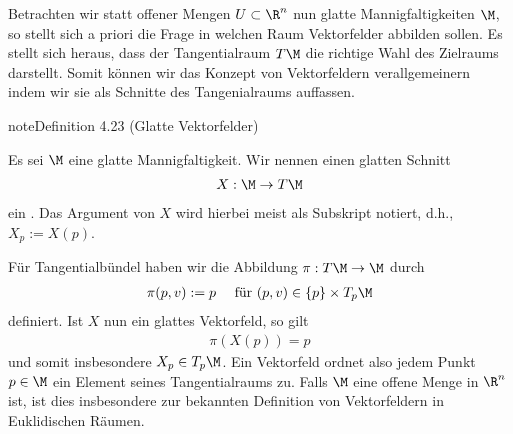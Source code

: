 \documentclass[letterpaper,10pt,english]{jupyterBook}
\begin{document}
\sphinxAtStartPar
Betrachten wir statt offener Mengen \(U\subset\R^n\) nun glatte Mannigfaltigkeiten \(\M\), so stellt sich a priori die Frage in welchen Raum Vektorfelder abbilden sollen.
Es stellt sich heraus, dass der Tangentialraum \(T\M\) die richtige Wahl des Zielraums darstellt.
Somit können wir das Konzept von Vektorfeldern verallgemeinern indem wir sie als Schnitte des Tangenialraums auffassen.
\label{manifolds/tangential:definition-30}
\begin{sphinxadmonition}{note}{Definition 4.23 (Glatte Vektorfelder)}



\sphinxAtStartPar
Es sei \(\M\) eine glatte Mannigfaltigkeit.
Wir nennen einen glatten Schnitt
\begin{equation*}
\begin{split}X:\M\to T\M\end{split}
\end{equation*}
\sphinxAtStartPar
ein .
Das Argument von \(X\) wird hierbei meist als Subskript notiert, d.h., \(X_p := X(p)\).
\end{sphinxadmonition}

\sphinxAtStartPar
Für Tangentialbündel haben wir die Abbildung \(\pi:T\M\to\M\) durch
\begin{equation*}
\begin{split}\pi(p,v):= p\quad\text{ für } (p,v)\in\{p\}\times T_p\M\end{split}
\end{equation*}
\sphinxAtStartPar
definiert.
Ist \(X\) nun ein glattes Vektorfeld, so gilt
\begin{equation*}
\begin{split}\pi(X(p)) = p\end{split}
\end{equation*}
\sphinxAtStartPar
und somit insbesondere \(X_p\in T_p\M\).
Ein Vektorfeld ordnet also jedem Punkt \(p\in\M\) ein Element seines Tangentialraums zu.
Falls \(\M\) eine offene Menge in \(\R^n\) ist, ist dies insbesondere  zur bekannten Definition von Vektorfeldern in Euklidischen Räumen.
\end{document}
